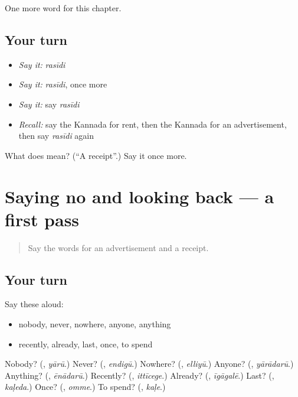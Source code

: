 \begin{grammarlens}[title={What you've built}]
One more word for this chapter.
\end{grammarlens}

\subsection*{Your turn}
\begin{itemize}
\raggedright
  \item \emph{Say it:} \emph{rasīdi}
  \item \emph{Say it:} \emph{rasīdi}, once more
  \item \emph{Say it:} say \emph{rasīdi}
  \item \emph{Recall:} say the Kannada for rent, then the Kannada for an advertisement, then say \emph{rasīdi} again
\end{itemize}

\begin{tcolorbox}[breakable,colback=teal!4,colframe=teal!35!black,title={Before you move on}]
What does  mean? (\textquotedblleft{}A receipt\textquotedblright{}.) Say it once more.
\end{tcolorbox}
\section[(dialogue)]{Saying no and looking back — a first pass}

\label{lesson:KA-R157-first-pass-saying-no-and-looking-back}



\begin{quote}
Say the words for an advertisement and a receipt.
\end{quote}

\subsection*{Your turn}
Say these aloud:

\begin{itemize}
\raggedright
  \item nobody, never, nowhere, anyone, anything
  \item recently, already, last, once, to spend
\end{itemize}

\begin{tcolorbox}[breakable,colback=teal!4,colframe=teal!35!black,title={Before you move on}]
Nobody? (\textbf{}, \emph{yārū}.) Never? (\textbf{}, \emph{endigū}.) Nowhere? (\textbf{}, \emph{elliyū}.) Anyone? (\textbf{}, \emph{yārādarū}.) Anything? (\textbf{}, \emph{ēnādarū}.) Recently? (\textbf{}, \emph{ittīcege}.) Already? (\textbf{}, \emph{īgāgalē}.) Last? (\textbf{}, \emph{kaḷeda}.) Once? (\textbf{}, \emph{omme}.) To spend? (\textbf{}, \emph{kaḷe}.)
\end{tcolorbox}
